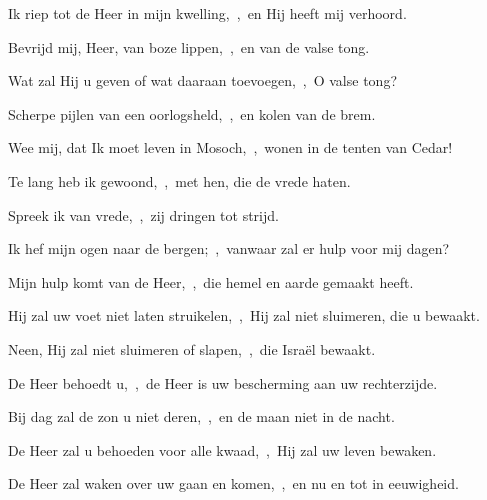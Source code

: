 \documentclass[12pt,twoside,a5paper]{article}
\begin{document}


\begin{halfparskip}
  Ik riep tot de Heer in mijn kwelling,~\sep\ en Hij heeft mij verhoord.


  Bevrijd mij, Heer, van boze lippen,~\sep\ en van de valse tong.

  Wat zal Hij u geven of wat daaraan toevoegen,~\sep\ O valse tong?

  Scherpe pijlen van een oorlogsheld,~\sep\ en kolen van de brem.

  Wee mij, dat Ik moet leven in Mosoch,~\sep\ wonen in de tenten van Cedar!

  Te lang heb ik gewoond,~\sep\ met hen, die de vrede haten.

  Spreek ik van vrede,~\sep\ zij dringen tot strijd.
\end{halfparskip}


\begin{halfparskip}
  Ik hef mijn ogen naar de bergen;~\sep\ vanwaar zal er hulp voor mij dagen?


  Mijn hulp komt van de Heer,~\sep\ die hemel en aarde gemaakt heeft.

  Hij zal uw voet niet laten struikelen,~\sep\ Hij zal niet sluimeren, die u bewaakt.

  Neen, Hij zal niet sluimeren of slapen,~\sep\ die Israël bewaakt.

  De Heer behoedt u,~\sep\ de Heer is uw bescherming aan uw rechterzijde.

  Bij dag zal de zon u niet deren,~\sep\ en de maan niet in de nacht.

  De Heer zal u behoeden voor alle kwaad,~\sep\ Hij zal uw leven bewaken.

  De Heer zal waken over uw gaan en komen,~\sep\ en nu en tot in eeuwigheid.
\end{halfparskip}

\end{document}
